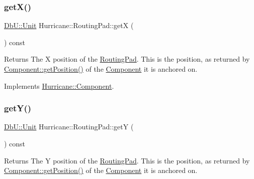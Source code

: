 \subsubsection{\texorpdfstring{get\+X()}{getX()}}
{\footnotesize\ttfamily \mbox{\hyperlink{group__DbUGroup_ga4fbfa3e8c89347af76c9628ea06c4146}{Db\+U\+::\+Unit}} Hurricane\+::\+Routing\+Pad\+::getX (\begin{DoxyParamCaption}{ }\end{DoxyParamCaption}) const\hspace{0.3cm}{\ttfamily [virtual]}}

\begin{DoxyReturn}{Returns}
The X position of the \mbox{\hyperlink{classHurricane_1_1RoutingPad}{Routing\+Pad}}. This is the position, as returned by \mbox{\hyperlink{classHurricane_1_1Component_aa4e9a47c89fe701670ca34355195d519}{Component\+::get\+Position()}} of the \mbox{\hyperlink{classHurricane_1_1Component}{Component}} it is anchored on. 
\end{DoxyReturn}


Implements \mbox{\hyperlink{classHurricane_1_1Component_a0f8299ed73705fd4fbf56589dcc7e074}{Hurricane\+::\+Component}}.

\mbox{\label{classHurricane_1_1RoutingPad_aede4c04a7f893b1e5478b164b6eaae2d}} 
\subsubsection{\texorpdfstring{get\+Y()}{getY()}}
{\footnotesize\ttfamily \mbox{\hyperlink{group__DbUGroup_ga4fbfa3e8c89347af76c9628ea06c4146}{Db\+U\+::\+Unit}} Hurricane\+::\+Routing\+Pad\+::getY (\begin{DoxyParamCaption}{ }\end{DoxyParamCaption}) const\hspace{0.3cm}{\ttfamily [virtual]}}

\begin{DoxyReturn}{Returns}
The Y position of the \mbox{\hyperlink{classHurricane_1_1RoutingPad}{Routing\+Pad}}. This is the position, as returned by \mbox{\hyperlink{classHurricane_1_1Component_aa4e9a47c89fe701670ca34355195d519}{Component\+::get\+Position()}} of the \mbox{\hyperlink{classHurricane_1_1Component}{Component}} it is anchored on. 
\end{DoxyReturn}


